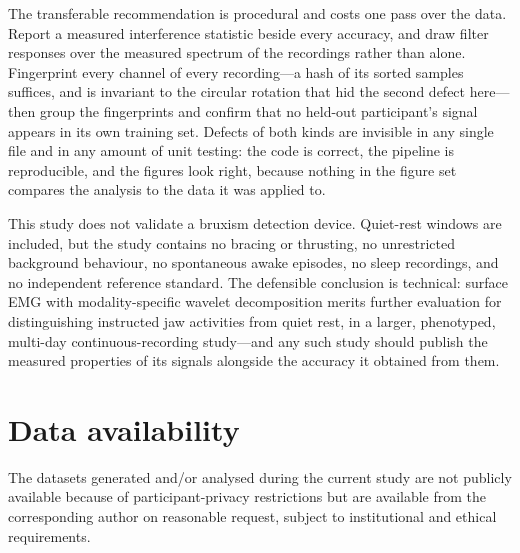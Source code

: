 \documentclass[pdflatex,sn-nature,iicol]{sn-jnl}
\begin{document}
The transferable recommendation is procedural and costs one pass over the data. Report a measured interference statistic beside every accuracy, and draw filter responses over the measured spectrum of the recordings rather than alone. Fingerprint every channel of every recording---a hash of its sorted samples suffices, and is invariant to the circular rotation that hid the second defect here---then group the fingerprints and confirm that no held-out participant's signal appears in its own training set. Defects of both kinds are invisible in any single file and in any amount of unit testing: the code is correct, the pipeline is reproducible, and the figures look right, because nothing in the figure set compares the analysis to the data it was applied to.

This study does not validate a bruxism detection device. Quiet-rest windows are included, but the study contains no bracing or thrusting, no unrestricted background behaviour, no spontaneous awake episodes, no sleep recordings, and no independent reference standard. The defensible conclusion is technical: surface EMG with modality-specific wavelet decomposition merits further evaluation for distinguishing instructed jaw activities from quiet rest, in a larger, phenotyped, multi-day continuous-recording study---and any such study should publish the measured properties of its signals alongside the accuracy it obtained from them.

\backmatter

\section*{Data availability}
The datasets generated and/or analysed during the current study are not publicly available because of participant-privacy restrictions but are available from the corresponding author on reasonable request, subject to institutional and ethical requirements.
\end{document}
